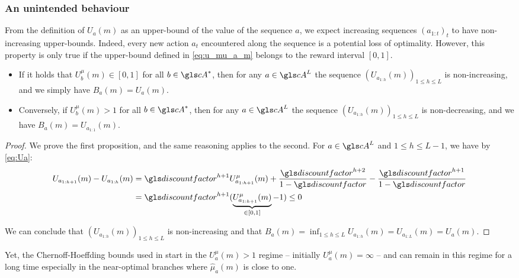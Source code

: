 \subsubsection{An unintended behaviour}
\label{sec:kl-olop-behaviour}
From the definition of $U_a(m)$ as an upper-bound of the value of the sequence $a$, we expect increasing sequences $(a_{1:t})_t$ to have non-increasing upper-bounds. Indeed, every new action $a_t$ encountered along the sequence is a potential loss of optimality.
However, this property is only true if the upper-bound defined in \eqref{eq:u_mu_a_m} belongs to the reward interval $[0,1]$.

\begin{lemma}
	\label{lemma:seq_values}
	\begin{leftbar}[lemmabar]
	\leavevmode\newline
	\begin{itemize}
	\item If it holds that $U^{\mu}_b(m) \in [0, 1]$ for all $b\in \cA^{\ast}$, then for any $a\in \cA^L$ the sequence $(U_{a_{1:h}}(m))_{1\leq h \leq L}$ is non-increasing, and we simply have $B_a(m) = U_a(m)$.
	\item Conversely, if $U^{\mu}_b(m) > 1$ for all $b\in \cA^{\ast}$, then for any $a\in \cA^L$ the sequence $(U_{a_{1:h}}(m))_{1\leq h \leq L}$ is non-decreasing, and we have $B_a(m) = U_{a_{1:1}}(m)$.
	\end{itemize}
	\end{leftbar}
\end{lemma}

\begin{proof}
	We prove the first proposition, and the same reasoning applies to the second. For $a\in \cA^L$ and $1 \leq h \leq L - 1$, we have by \eqref{eq:Ua}:
	\begin{align*}
	U_{a_{1:h+1}}(m) - U_{a_{1:h}}(m) &= \discount^{h+1}U^{\mu}_{a_{1:h+1}}(m) + \frac{\discount^{h+2}}{1-\discount} - \frac{\discount^{h+1}}{1-\discount}\\
	&= \discount^{h+1}(\underbrace{U^{\mu}_{a_{1:h+1}}(m)}_{\in [0, 1]} - 1) \leq 0
	\end{align*}
	
	\noindent
	We can conclude that $(U_{a_{1:h}}(m))_{1\leq h \leq L}$ is non-increasing and that $B_a(m) = \inf_{1 \leq h \leq L} U_{a_{1:h}}(m) = U_{a_{1:L}}(m) = U_a(m)$.
\end{proof}

Yet, the Chernoff-Hoeffding bounds used in \OLOP start in the $U^{\mu}_a(m) > 1$ regime -- initially $U^{\mu}_a(m) = \infty$ -- and can remain in this regime for a long time especially in the near-optimal branches where $\hat{\mu}_a(m)$ is close to one.

